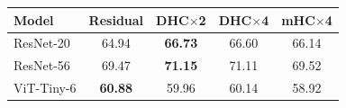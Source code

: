 \begin{tabular}{lcccc}
\toprule
Model & Residual & DHC$\times$2 & DHC$\times$4 & mHC$\times$4 \\
\midrule
ResNet-20 & 64.94 & \textbf{66.73} & 66.60 & 66.14 \\
ResNet-56 & 69.47 & \textbf{71.15} & 71.11 & 69.52 \\
ViT-Tiny-6 & \textbf{60.88} & 59.96 & 60.14 & 58.92 \\
\bottomrule
\end{tabular}
